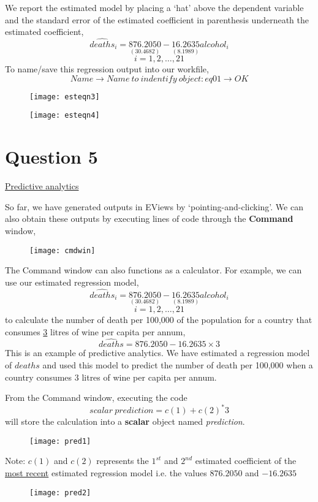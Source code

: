 \documentclass[12pt]{report}
\begin{document}
		\vspace{-\baselineskip}
		\noindent We report the estimated model by placing a `hat' above the dependent variable and the standard error of the estimated coefficient in parenthesis underneath the estimated coefficient,
		$$\widehat{deaths}_i = \underset{(30.4682)}{876.2050}-\underset{(8.1989)}{16.2635}alcohol_i$$
		$$i = 1, 2, \dots, 21$$
		\noindent To name/save this regression output into our workfile,
		$$Name \to Name\ to\ indentify\ object:eq01 \to OK$$
		\begin{figure}[H]
			\centering
			\texttt{[image: esteqn3]}
		\end{figure}
		\vspace{-\baselineskip}
		\begin{figure}[H]
			\centering
			\texttt{[image: esteqn4]}
		\end{figure}
		\vspace{-\baselineskip}
	\newpage	
	\section*{Question 5}
	\underline{Predictive analytics}
	
		\noindent So far, we have generated outputs in EViews by `pointing-and-clicking'. We can also obtain these outputs by executing lines of code through the \textbf{Command} window,
		\begin{figure}[H]
			\centering
			\texttt{[image: cmdwin]}
		\end{figure}
		\vspace{-\baselineskip}
		\noindent The Command window can also functions as a calculator. For example, we can use our estimated regression model,
		$$\widehat{deaths}_i = \underset{(30.4682)}{876.2050}-\underset{(8.1989)}{16.2635}alcohol_i$$
		$$i = 1, 2, \dots, 21$$
		\noindent to calculate the number of death per 100,000 of the population for a country that consumes \underline{3} litres of wine per capita per annum,
		$$\widehat{deaths} = 876.2050 - 16.2635\times3$$ This is an example of predictive analytics. We have estimated a regression model of $deaths$ and used this model to predict the number of death per 100,000 when a country consumes 3 litres of wine per capita per annum.
		
		\noindent From the Command window, executing the code
		$$scalar\ prediction=c(1)+c(2)^*3$$
		will store the calculation into a \textbf{scalar} object named \textit{prediction}.
		\begin{figure}[H]
			\centering
			\texttt{[image: pred1]}
		\end{figure}
		\vspace{-\baselineskip}
		\noindent Note: $c(1)$ and $c(2)$ represents the $1^{st}$ and $2^{nd}$ estimated coefficient of the \underline{most recent} estimated regression model i.e. the values $876.2050$ and $-16.2635$
		
		\begin{figure}[H]
			\centering
			\texttt{[image: pred2]}
		\end{figure}
		\vspace{-\baselineskip}
		
\end{document}

